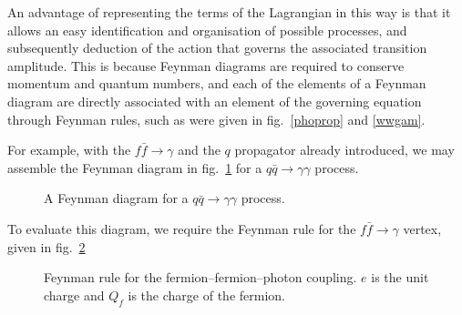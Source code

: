 An advantage of representing the terms of the Lagrangian in this way is that it allows an easy identification and organisation of possible processes, and subsequently deduction of the action that governs the associated transition amplitude. This is because Feynman diagrams are required to conserve momentum and quantum numbers, and each of the elements of a Feynman diagram are directly associated with an element of the governing equation through Feynman rules, such as were given in fig.~\ref{phoprop} and \ref{wwgam}.

For example, with the $f\bar f \rightarrow \gamma$ and the $q$ propagator already introduced, we may assemble the Feynman diagram in fig.~\ref{bornqq2gg} for a $q\bar q \rightarrow \gamma\gamma$ process.

\begin{figure}[hbtp]
\begin{minipage}[b]{.69\textwidth}
\begin{center}\begin{footnotesize}
\end{footnotesize}\end{center}
\end{minipage}\hfill
\begin{minipage}[b]{.3\textwidth}
\caption{A Feynman diagram for a $q\bar q \rightarrow \gamma\gamma$ process.}\label{bornqq2gg}
\end{minipage}
\end{figure}

To evaluate this diagram, we require the Feynman rule for the $f\bar f \rightarrow \gamma$ vertex, given in fig.~\ref{ruleqqgam}

\begin{figure}[hbtp]
\begin{minipage}[b]{.69\textwidth}
\centering\footnotesize
{}
\end{minipage}\hfill
\begin{minipage}[b]{.3\textwidth}
\caption{Feynman rule for the fermion--fermion--photon coupling. $e$ is the unit charge and $Q_f$ is the charge of the fermion.}\label{ruleqqgam}
\end{minipage}
\end{figure}

